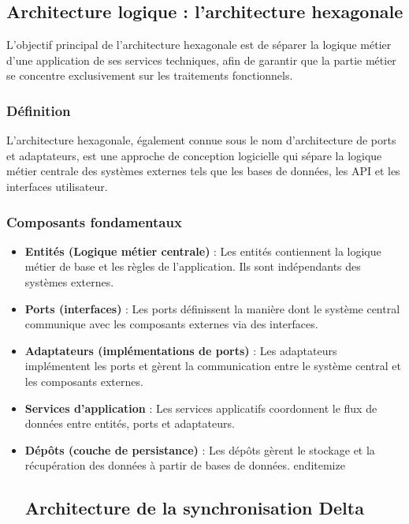 \begin{enumerate}
\begin{itemize}
\begin{itemize}
\begin{itemize}
\subsection{Architecture logique : l'architecture hexagonale}

L'objectif principal de l'architecture hexagonale est de séparer la logique métier d'une application de ses services techniques, afin de garantir que la partie métier se concentre exclusivement sur les traitements fonctionnels.

\subsubsection{Définition}

L'architecture hexagonale, également connue sous le nom d'architecture de ports et adaptateurs, est une approche de conception logicielle qui sépare la logique métier centrale des systèmes externes tels que les bases de données, les API et les interfaces utilisateur.

\subsubsection{Composants fondamentaux}

\begin{itemize}
    \item \textbf{Entités (Logique métier centrale)} : Les entités contiennent la logique métier de base et les règles de l'application. Ils sont indépendants des systèmes externes.
    
    \item \textbf{Ports (interfaces)} : Les ports définissent la manière dont le système central communique avec les composants externes via des interfaces.
    
    \item \textbf{Adaptateurs (implémentations de ports)} : Les adaptateurs implémentent les ports et gèrent la communication entre le système central et les composants externes.
    
    \item \textbf{Services d'application} : Les services applicatifs coordonnent le flux de données entre entités, ports et adaptateurs.
    
    \item \textbf{Dépôts (couche de persistance)} : Les dépôts gèrent le stockage et la récupération des données à partir de bases de données.
end{itemize}

\subsection{Architecture de la synchronisation Delta}


\end{itemize}
\end{itemize}
\end{itemize}
\end{itemize}
\end{enumerate}
